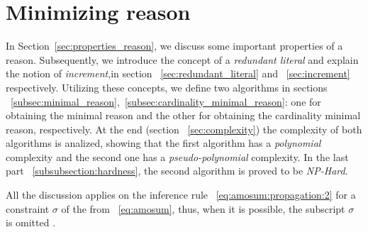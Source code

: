 \chapter{Minimizing reason}
\label{cp:minimizing_reason}
In Section~\ref{sec:properties_reason},
we  discuss some important properties of a reason. Subsequently,
we introduce the concept of a \textit{redundant literal}
and explain the notion of \textit{increment},in section ~\ref{sec:redundant_literal} and ~\ref{sec:increment} respectively.
Utilizing these concepts,
we define two algorithms in sections ~\ref{subsec:minimal_reason},~\ref{subsec:cardinality_minimal_reason}: one for obtaining 
the minimal reason and the other for obtaining the cardinality minimal reason, respectively.
At the end (section ~\ref{sec:complexity}) the complexity of both algorithms is analized, showing that
the first algorithm has a \textit{polynomial} complexity and the second one has a \textit{pseudo-polynomial}
complexity.
In the last part ~\ref{subsubsection:hardness}, the second algorithm is proved to be \textit{NP-Hard}. 

All the discussion applies on the inference rule ~\eqref{eq:amosum:propagation:2} for a constraint $\sigma$ of the from ~\eqref{eq:amosum}, thus, when it is possible, the subscript 
${\sigma}$ is omitted .


